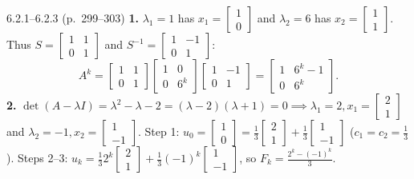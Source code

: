 \documentclass[11pt,a4paper,openany,oneside]{book}
\def\vect#1{#1}%
\def\mathbf#1{#1}%
\newcommand{\vect}[1]{\mathbf{#1}}
\numberwithin{equation}{chapter}
\begin{document}
\vfill
\begin{pageend_sol}{6.2.1--6.2.3 (p.\ 299--303)}
\textbf{1.} $\lambda_1=1$ has $\vect{x}_1 = \begin{bmatrix}1\\0\end{bmatrix}$ and $\lambda_2=6$ has $\vect{x}_2 = \begin{bmatrix}1\\1\end{bmatrix}$. Thus $S = \begin{bmatrix}1 & 1\\0 & 1\end{bmatrix}$ and $S^{-1} = \begin{bmatrix}1 & -1\\0 & 1\end{bmatrix}$:
\[
A^k = \begin{bmatrix}1 & 1\\0 & 1\end{bmatrix}\begin{bmatrix}1 & 0\\0 & 6^k\end{bmatrix}\begin{bmatrix}1 & -1\\0 & 1\end{bmatrix} = \begin{bmatrix}1 & 6^k - 1\\0 & 6^k\end{bmatrix}.
\]
\textbf{2.} $\det(A-\lambda I) = \lambda^2 - \lambda - 2 = (\lambda-2)(\lambda+1) = 0 \implies \lambda_1=2, \vect{x}_1=\begin{bmatrix}2\\1\end{bmatrix}$ and $\lambda_2=-1, \vect{x}_2=\begin{bmatrix}1\\-1\end{bmatrix}$. Step 1: $\vect{u}_0 = \begin{bmatrix}1\\0\end{bmatrix} = \frac{1}{3}\begin{bmatrix}2\\1\end{bmatrix} + \frac{1}{3}\begin{bmatrix}1\\-1\end{bmatrix}$ ($c_1=c_2=\frac{1}{3}$). Steps 2--3: $\vect{u}_k = \frac{1}{3}2^k\begin{bmatrix}2\\1\end{bmatrix} + \frac{1}{3}(-1)^k\begin{bmatrix}1\\-1\end{bmatrix}$, so $F_k = \frac{2^k - (-1)^k}{3}$.
\end{pageend_sol}
\clearpage
\end{document}
